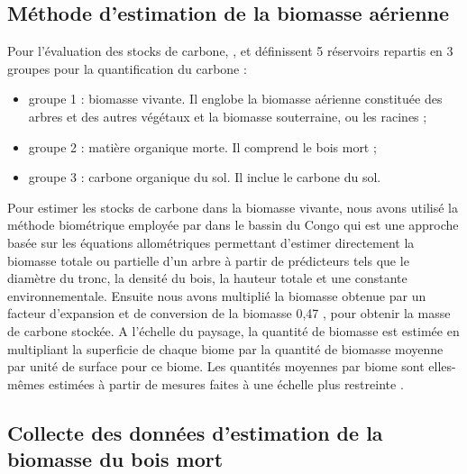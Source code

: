 \documentclass[
  12pt,
  a4paper,
  extrafontsizes,
  onecolumn,
  openright]{book}
\theoremstyle{definition}
\theoremstyle{definition}
\theoremstyle{definition}
\theoremstyle{definition}
\theoremstyle{remark}
\begin{document}
\hypertarget{muxe9thode-destimation-de-la-biomasse-auxe9rienne}{%
\subsection{Méthode d'estimation de la biomasse aérienne}\label{muxe9thode-destimation-de-la-biomasse-auxe9rienne}}

Pour l'évaluation des stocks de carbone, \citet{CIFOR2009}, \citet{Penman2003} et \citet{MacDicken1997} définissent 5 réservoirs repartis en 3 groupes pour la quantification du carbone :

\begin{itemize}
\item
  groupe 1 : biomasse vivante. Il englobe la biomasse aérienne constituée des arbres et des autres végétaux et la biomasse souterraine, ou les racines ;
\item
  groupe 2 : matière organique morte. Il comprend le bois mort ;
\item
  groupe 3 : carbone organique du sol. Il inclue le carbone du sol.
\end{itemize}

Pour estimer les stocks de carbone dans la biomasse vivante, nous avons utilisé la méthode biométrique employée par \citet{Fayolle2018} dans le bassin du Congo qui est une approche basée sur les équations allométriques permettant d'estimer directement la biomasse totale ou partielle d'un arbre à partir de prédicteurs tels que le diamètre du tronc, la densité du bois, la hauteur totale et une constante environnementale. Ensuite nous avons multiplié la biomasse obtenue par un facteur d'expansion et de conversion de la biomasse 0,47 \citep{Zapfack2013}, pour obtenir la masse de carbone stockée. A l'échelle du paysage, la quantité de biomasse est estimée en multipliant la superficie de chaque biome par la quantité de biomasse moyenne par unité de surface pour ce biome. Les quantités moyennes par biome sont elles-mêmes estimées à partir de mesures faites à une échelle plus restreinte \citep{Mounmemi2021}.

\hypertarget{collecte-des-donnuxe9es-destimation-de-la-biomasse-du-bois-mort}{%
\subsection{Collecte des données d'estimation de la biomasse du bois mort}\label{collecte-des-donnuxe9es-destimation-de-la-biomasse-du-bois-mort}}
\end{document}
